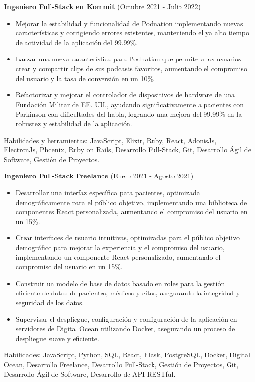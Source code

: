  \vspace*{0.2cm}
  \textbf{Ingeniero Full-Stack en \href{https://kommit.co/}{Kommit}} (Octubre 2021 - Julio 2022)
  \hfill
  \vspace*{0.2cm}
  \begin{minipage}{\linewidth}
    \begin{itemize}[noitemsep]
      \item Mejorar la estabilidad y funcionalidad de \href{https://www.podnation.co/}{Podnation} implementando nuevas características y corrigiendo errores existentes, manteniendo el ya alto tiempo de actividad de la aplicación del 99.99\%.
      \item Lanzar una nueva característica para \href{https://www.podnation.co/}{Podnation} que permite a los usuarios crear y compartir clips de sus podcasts favoritos, aumentando el compromiso del usuario y la tasa de conversión en un 10\%.
      \item Refactorizar y mejorar el controlador de dispositivos de hardware de una Fundación Militar de EE. UU., ayudando significativamente a pacientes con Parkinson con dificultades del habla, logrando una mejora del 99.99\% en la robustez y estabilidad de la aplicación.
    \end{itemize}
    \hfill
  \end{minipage}
  Habilidades y herramientas: JavaScript, Elixir, Ruby, React, AdonisJs, ElectronJs, Phoenix, Ruby on Rails, Desarrollo Full-Stack, Git, Desarrollo Ágil de Software, Gestión de Proyectos.

  \vspace*{0.2cm}
  \textbf{Ingeniero Full-Stack Freelance} (Enero 2021 - Agosto 2021)
  \hfill
  \vspace*{0.2cm}
  \begin{minipage}{\linewidth}
    \begin{itemize}[noitemsep]
      \item Desarrollar una interfaz específica para pacientes, optimizada demográficamente para el público objetivo, implementando una biblioteca de componentes React personalizada, aumentando el compromiso del usuario en un 15\%.
      \item Crear interfaces de usuario intuitivas, optimizadas para el público objetivo demográfico para mejorar la experiencia y el compromiso del usuario, implementando un componente React personalizado, aumentando el compromiso del usuario en un 15\%.
      \item Construir un modelo de base de datos basado en roles para la gestión eficiente de datos de pacientes, médicos y citas, asegurando la integridad y seguridad de los datos.
      \item Supervisar el despliegue, configuración y configuración de la aplicación en servidores de Digital Ocean utilizando Docker, asegurando un proceso de despliegue suave y eficiente.
    \end{itemize}
    \hfill
  \end{minipage}
  Habilidades: JavaScript, Python, SQL, React, Flask, PostgreSQL, Docker, Digital Ocean, Desarrollo Freelance, Desarrollo Full-Stack, Gestión de Proyectos, Git, Desarrollo Ágil de Software, Desarrollo de API RESTful.

